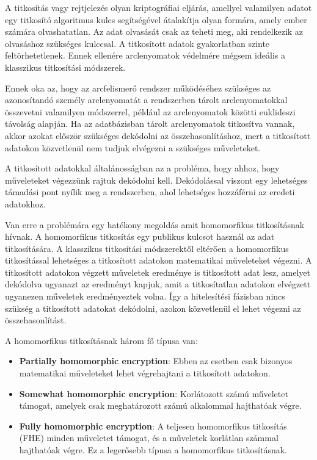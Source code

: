 

A titkosítás vagy rejtjelezés olyan kriptográfiai eljárás, amellyel valamilyen adatot egy titkosító algoritmus kulcs segítségével átalakítja olyan formára, amely ember számára olvashatatlan. Az adat olvasását csak az teheti meg, aki rendelkezik az olvasáshoz szükséges kulccsal. A titkosított adatok gyakorlatban szinte feltörhetetlenek. Ennek ellenére arclenyomatok védelmére mégsem ideális a klasszikus titkosítási módszerek. 

Ennek oka az, hogy az arcfelismerő rendszer működéséhez szükséges az azonosítandó személy arclenyomatát a rendszerben tárolt arclenyomatokkal összevetni valamilyen módszerrel, például az arclenyomatok közötti euklideszi távolság alapján. Ha az adatbázisban tárolt arclenyomatok titkosítva vannak, akkor azokat először szükséges dekódolni az összehasonlításhoz, mert a titkosított adatokon közvetlenül nem tudjuk elvégezni a szükséges műveleteket. 

A titkosított adatokkal általánosságban az a probléma, hogy ahhoz, hogy műveleteket végezzünk rajtuk dekódolni kell. Dekódolással viszont egy lehetséges támadási pont nyílik meg a rendszerben, ahol lehetséges hozzáférni az eredeti adatokhoz.

Van erre a problémára egy hatékony megoldás amit homomorfikus titkosításnak hívnak. A homomorfikus titkosítás egy publikus kulcsot használ az adat titkosítására. A klasszikus titkosítási módszerektől eltérően a homomorfikus titkosítással lehetséges a titkosított adatokon matematikai műveleteket végezni. A titkosított adatokon végzett műveletek eredménye is titkosított adat lesz, amelyet dekódolva ugyanazt az eredményt kapjuk, amit a titkosítatlan adatokon elvégzett ugyanezen műveletek eredményeztek volna. Így a hitelesítési fázisban nincs szükség a titkosított adatokat dekódolni, azokon közvetlenül el lehet végezni az összehasonlítást. 

A homomorfikus titkosításnak három fő típusa van:

\begin{itemize}
	\item \textbf{Partially homomorphic encryption}: Ebben az esetben csak bizonyos matematikai műveleteket lehet végrehajtani a titkosított adatokon.
	\item \textbf{Somewhat homomorphic encryption}: Korlátozott számú műveletet támogat, amelyek csak meghatározott számú alkalommal hajthatóak végre.
	\item \textbf{Fully homomorphic encryption}: A teljesen homomorfikus titkosítás (FHE) minden műveletet támogat, és a műveletek korlátlan számmal hajthatóak végre. Ez a legerősebb típusa a homomorfikus titkosításnak. 
\end{itemize}

